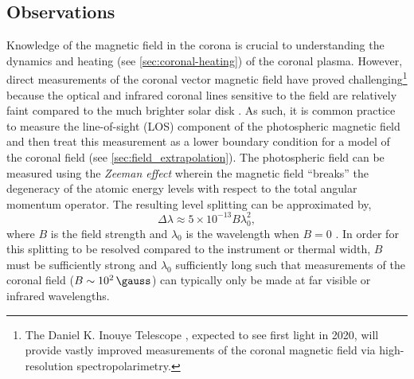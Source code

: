 \subsection{Observations}\label{sec:magnetic-observations}

Knowledge of the magnetic field in the corona is crucial to understanding the dynamics and heating (see \autoref{sec:coronal-heating}) of the coronal plasma. However, direct measurements of the coronal vector magnetic field have proved challenging\footnote{The Daniel K. Inouye Telescope \citep{elmore_daniel_2014}, expected to see first light in 2020, will provide vastly improved measurements of the coronal magnetic field via high-resolution spectropolarimetry.} because the optical and infrared coronal lines sensitive to the field are relatively faint compared to the much brighter solar disk \citep{judge_coronal_2001}. As such, it is common practice to measure the line-of-sight (LOS) component of the photospheric magnetic field and then treat this measurement as a lower boundary condition for a model of the coronal field (see \autoref{sec:field_extrapolation}). The photospheric field can be measured using the \textit{Zeeman effect} wherein the magnetic field ``breaks'' the degeneracy of the atomic energy levels with respect to the total angular momentum operator. The resulting level splitting can be approximated by,
\begin{equation}\label{eq:zeeman}
    \Delta\lambda \approx 5\times10^{-13}B\lambda_0^2,
\end{equation}
where $B$ is the field strength and $\lambda_0$ is the wavelength when $B=0$ \citep{phillips_ultraviolet_2008}. In order for this splitting to be resolved compared to the instrument or thermal width, $B$ must be sufficiently strong and $\lambda_0$ sufficiently long such that measurements of the coronal field ($B\sim\SI{e2}{\gauss}$) can typically only be made at far visible or infrared wavelengths.


